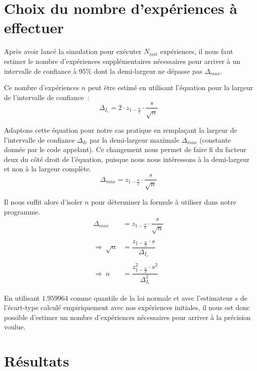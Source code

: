 \documentclass[paper=a4, fontsize=11pt]{scrartcl}
\begin{document}
\section{Choix du nombre d'expériences à effectuer}

Après avoir lancé la simulation pour exécuter $N_{init}$ expériences, il nous faut estimer le nombre d'expériences supplémentaires nécessaires pour arriver à un intervalle de confiance à 95\% dont la demi-largeur ne dépasse pas $\Delta_{max}$.

Ce nombre d'expériences $n$ peut être estimé en utilisant l'équation pour la largeur de l'intervalle de confiance~:
\begin{equation*}
  \Delta_{I_c} = 2\cdot z_{1-\frac{\alpha}{2}}\cdot \dfrac{s}{\sqrt{n}}
\end{equation*}

Adaptons cette équation pour notre cas pratique en remplaçant la largeur de l'intervalle de confiance $\Delta_{Ic}$ par la demi-largeur maximale $\Delta_{max}$ (constante donnée par le code appelant). Ce changement nous permet de faire fi du facteur deux du côté droit de l'équation, puisque nous nous intéressons à la demi-largeur et non à la largeur complète.
\begin{equation*}
  \Delta_{max} = z_{1-\frac{\alpha}{2}}\cdot \dfrac{s}{\sqrt{n}}
\end{equation*}

Il nous suffit alors d'isoler $n$ pour déterminer la formule à utiliser dans notre programme.
\begin{align*}
  \Delta_{max} &= z_{1-\frac{\alpha}{2}}\cdot \dfrac{s}{\sqrt{n}} \\ \\
  \Rightarrow \ \sqrt{n} &= \dfrac{z_{1-\frac{\alpha}{2}}\cdot s}{\Delta_{I_c}} \\ \\
  \Rightarrow \ n &= \dfrac{z_{1-\frac{\alpha}{2}}^2\cdot s^2}{\Delta_{I_c}^2}
\end{align*}

En utilisant $1.959964$ comme quantile de la loi normale et avec l'estimateur $s$ de l'écart-type calculé empiriquement avec nos expériences initiales, il nous est donc possible d'estimer un nombre d'expériences nécessaires pour arriver à la précision voulue.

\section{Résultats}
\end{document}

